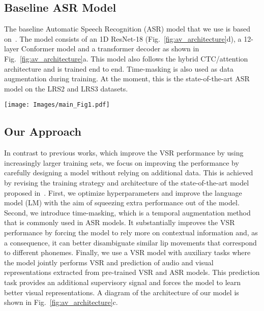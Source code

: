 \documentclass[twocolumn]{article}
\begin{document}
\subsection{Baseline ASR Model}
\label{ssec:ASR_model}
The baseline Automatic Speech Recognition (ASR) model that we use is based on~\cite{DBLP:journals/corr/abs-2102-06657}. The model consists of an 1D ResNet-18 (Fig.~\ref{fig:av_architecture}d), a 12-layer Conformer model and a transformer decoder as shown in Fig.~\ref{fig:av_architecture}a. This model also follows the hybrid CTC/attention architecture and is trained end to end. Time-masking is also used as data augmentation during training. At the moment, this is the state-of-the-art ASR model on the LRS2 and LRS3 datasets.

\begin{figure*}[tb]
\texttt{[image: Images/main\_Fig1.pdf]}
\caption{Model architecture overview. a-c, Baseline ASR model (a), baseline VSR model (b) and proposed model (c) with prediction-based auxiliary tasks. The frame rate of extracted visual features and audio features is 25. (d), The architecture of the ASR encoder from a. e, The architecture of the VSR encoder from b.}
\label{fig:av_architecture}
\end{figure*}
 \subsection{Our Approach}
In contrast to previous works, which improve the VSR performance by using increasingly larger training sets, we focus on improving the performance by carefully designing a model without relying on additional data. This is achieved by revising the training strategy and architecture of the state-of-the-art model proposed in~\cite{DBLP:journals/corr/abs-2102-06657}.
First, we optimize hyperparameters and improve the language model (LM) with the aim of squeezing extra performance out of the model. Second, we introduce time-masking, which is a temporal augmentation method that is commonly used in ASR models. It substantially improves the VSR performance by forcing the model to rely more on contextual information and, as a consequence, it can better disambiguate similar lip movements that correspond to different phonemes. Finally, we use a VSR model with auxiliary tasks where the model jointly performs VSR and prediction of audio and visual representations extracted from pre-trained VSR and ASR models. This prediction task provides an additional supervisory signal and forces the model to learn better visual representations. A diagram of the architecture of our model is shown in Fig.~\ref{fig:av_architecture}c.
\end{document}
